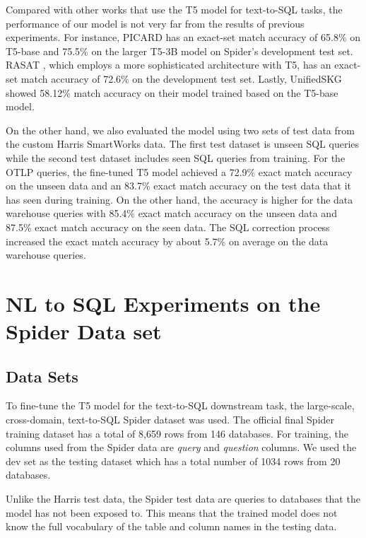 \documentclass[conference]{IEEEtran}
\begin{document}
Compared with other works that use the T5 model for text-to-SQL tasks, the performance of our model is not very far from the results of previous experiments. For instance, PICARD \cite{Scholak2021PICARD:Models} has an exact-set match accuracy of 65.8\% on T5-base and 75.5\% on the larger T5-3B model on Spider’s development test set. RASAT \cite{Qi2022RASAT:Text-to-SQL}, which employs a more sophisticated architecture with T5, has an exact-set match accuracy of 72.6\% on the development test set. Lastly, UnifiedSKG \cite{Xie2022UnifiedSKG:Models} showed 58.12\% match accuracy on their model trained based on the T5-base model.

On the other hand, we also evaluated the model using two sets of test data from the custom Harris SmartWorks data. The first test dataset is unseen SQL queries while the second test dataset includes seen SQL queries from training. For the OTLP queries, the fine-tuned T5 model achieved a 72.9\% exact match accuracy on the unseen data and an 83.7\% exact match accuracy on the test data that it has seen during training. On the other hand, the accuracy is higher for the data warehouse queries with 85.4\% exact match accuracy on the unseen data and 87.5\% exact match accuracy on the seen data. The SQL correction process increased the exact match accuracy by about 5.7\% on average on the data warehouse queries.


\section{NL to SQL Experiments on the Spider Data set} 
\subsection{Data Sets}

To fine-tune the T5 model for the text-to-SQL downstream task, the large-scale, cross-domain, text-to-SQL Spider \cite{Yu2018Spider:Task} dataset was used. The official final Spider training dataset has a total of 8,659 rows from 146 databases. For training, the columns used from the Spider data are \emph{query} and \emph{question} columns. We used the dev set as the testing dataset which has a total number of 1034 rows from 20 databases. 

Unlike the Harris test data, the Spider test data are queries to databases that the model has not been exposed to. This means that the trained model does not know the full vocabulary of the table and column names in the testing data.
\end{document}
